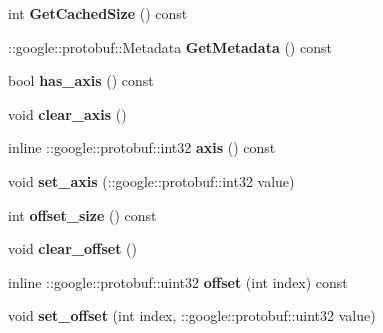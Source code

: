 \begin{DoxyCompactItemize}
int {\bfseries Get\+Cached\+Size} () const
\item 
\mbox{\label{classcaffe_1_1_crop_parameter_a16f02f9a52dddada6d671cfc5040b605}} 
\+::google\+::protobuf\+::\+Metadata {\bfseries Get\+Metadata} () const
\item 
\mbox{\label{classcaffe_1_1_crop_parameter_a92321ffb59469784991a6ec940d35483}} 
bool {\bfseries has\+\_\+axis} () const
\item 
\mbox{\label{classcaffe_1_1_crop_parameter_a10d5af89a92294f8b7e8d0ef0dcca7cd}} 
void {\bfseries clear\+\_\+axis} ()
\item 
\mbox{\label{classcaffe_1_1_crop_parameter_a466ebb7e21c9f94e9ff07f524022f613}} 
inline \+::google\+::protobuf\+::int32 {\bfseries axis} () const
\item 
\mbox{\label{classcaffe_1_1_crop_parameter_a41dd82ec4b64e5d8036c6c5205f9956c}} 
void {\bfseries set\+\_\+axis} (\+::google\+::protobuf\+::int32 value)
\item 
\mbox{\label{classcaffe_1_1_crop_parameter_ae617ba819ddad9c8325e85f0138e00bf}} 
int {\bfseries offset\+\_\+size} () const
\item 
\mbox{\label{classcaffe_1_1_crop_parameter_af79fc7f05837827e0af6b0caa9b6e0b4}} 
void {\bfseries clear\+\_\+offset} ()
\item 
\mbox{\label{classcaffe_1_1_crop_parameter_ab6f03f70731bff6bfdb6b2439679fae0}} 
inline \+::google\+::protobuf\+::uint32 {\bfseries offset} (int index) const
\item 
\mbox{\label{classcaffe_1_1_crop_parameter_a35718e8324f05336542cb1ba75b82a8c}} 
void {\bfseries set\+\_\+offset} (int index, \+::google\+::protobuf\+::uint32 value)
\item 
\mbox{\label{classcaffe_1_1_crop_parameter_a827d1d3d4f0e7ab6807eaaed4f63c75b}} 

\end{DoxyCompactItemize}
